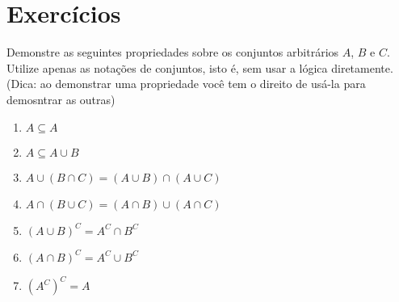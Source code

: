 \section{Exercícios}
\exercise Demonstre as seguintes propriedades sobre os conjuntos arbitrários $A$, $B$ e $C$. Utilize apenas as notações de conjuntos, isto é, sem usar a lógica diretamente. (Dica: ao demonstrar uma propriedade você tem o direito de usá-la para demosntrar as outras)
\begin{enumerate}
	\item $A \subseteq A$
	\item $A \subseteq A \cup B$
	\item $A \cup (B \cap C) = (A \cup B) \cap (A \cup C)$
	\item $A \cap (B \cup C) = (A \cap B) \cup (A \cap C)$
	\item $(A \cup B)^C = A^C \cap B^C$
	\item $(A \cap B)^C = A^C \cup B^C$
	\item $(A^C)^C = A$	
\end{enumerate}
